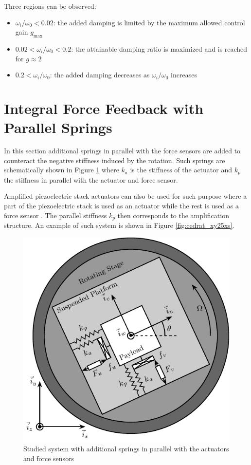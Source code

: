 \documentclass[Afour,sagev,times]{sagej}
\begin{document}
Three regions can be observed:
\begin{itemize}
\item \(\omega_i/\omega_0 < 0.02\): the added damping is limited by the maximum allowed control gain \(g_{\text{max}}\)
\item \(0.02 < \omega_i/\omega_0 < 0.2\): the attainable damping ratio is maximized and is reached for \(g \approx 2\)
\item \(0.2 < \omega_i/\omega_0\): the added damping decreases as \(\omega_i/\omega_0\) increases
\end{itemize}

\section{Integral Force Feedback with Parallel Springs}
\label{sec:org1c4a11f}
\label{sec:iff_kp}
In this section additional springs in parallel with the force sensors are added to counteract the negative stiffness induced by the rotation.
Such springs are schematically shown in Figure \ref{fig:system_parallel_springs} where \(k_a\) is the stiffness of the actuator and \(k_p\) the stiffness in parallel with the actuator and force sensor.

Amplified piezoelectric stack actuators can also be used for such purpose where a part of the piezoelectric stack is used as an actuator while the rest is used as a force sensor \cite{souleille18_concep_activ_mount_space_applic}.
The parallel stiffness \(k_p\) then corresponds to the amplification structure.
An example of such system is shown in Figure \ref{fig:cedrat_xy25xs}.

\begin{figure}[htbp]
\centering
\includegraphics[width=0.8\linewidth]{figs/system_parallel_springs.pdf}
\caption{\label{fig:system_parallel_springs}Studied system with additional springs in parallel with the actuators and force sensors}
\end{figure}
\end{document}
